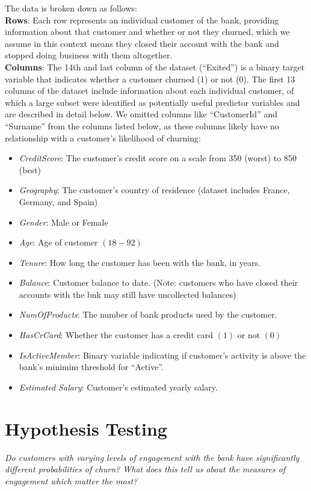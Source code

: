 \documentclass[twoside,twocolumn]{article}
\begin{document}
\noindent The data is broken down as follows:\smallskip\\
\noindent\textbf{Rows}: Each row represents an individual customer of the bank, providing information about that customer and whether or not they churned, which we assume in this context means they closed their account with the bank and stopped doing business with them altogether.\smallskip\\
\noindent\textbf{Columns}: The 14th and last column of the dataset (“Exited”) is a binary target variable that indicates whether a customer churned (1) or not (0). The first 13 columns of the dataset include information about each individual customer, of which a large subset were identified as potentially useful predictor variables and are described in detail below. We omitted columns like “CustomerId” and “Surname” from the columns listed below, as these columns likely have no relationship with a customer’s likelihood of churning:
\begin{itemize}
  \item \textit{CreditScore}: The customer’s credit score on a scale from 350 (worst) to 850 (best)
  \item \textit{Geography}: The customer’s country of residence (dataset includes France, Germany, and Spain)
  \item \textit{Gender}: Male or Female
  \item \textit{Age}: Age of customer $(18-92)$
  \item \textit{Tenure}: How long the customer has been with the bank, in years.
  \item \textit{Balance}: Customer balance to date. (Note: customers who have closed their accounts with the bnk may still have uncollected balances)
  \item \textit{NumOfProducts}: The number of bank products used by the customer.
  \item \textit{HasCrCard}: Whether the customer has a credit card $(1)$ or not $(0)$
  \item \textit{IsActiveMember}: Binary variable indicating if customer's activity is above the bank's minimim threshold for ``Active''.
  \item \textit{Estimated Salary}: Customer's estimated yearly salary.
\end{itemize}

\section{Hypothesis Testing}
\small \textit{Do customers with varying levels of engagement with the bank have significantly different probabilities of churn? What does this tell us about the measures of engagement which matter the most?}\medskip
\end{document}
